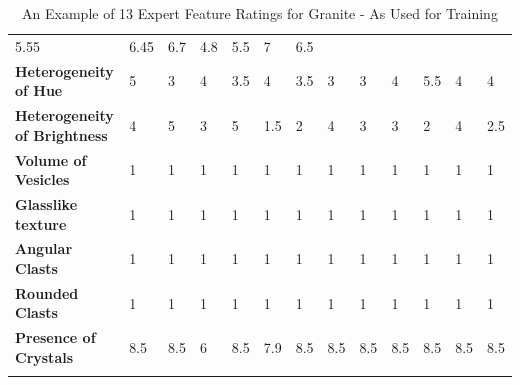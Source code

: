 \begin{longtable}[c]{@{}lllllllllllll@{}}
  5.55 &
  6.45 &
  6.7 &
  4.8 &
  5.5 &
  7 &
  6.5 \\
\cellcolor[HTML]{E2EFDA}\textbf{Heterogeneity   of Hue} &
  5 &
  3 &
  4 &
  3.5 &
  4 &
  3.5 &
  3 &
  3 &
  4 &
  5.5 &
  4 &
  4 \\
\cellcolor[HTML]{E2EFDA}\textbf{Heterogeneity   of Brightness} &
  4 &
  5 &
  3 &
  5 &
  1.5 &
  2 &
  4 &
  3 &
  3 &
  2 &
  4 &
  2.5 \\
\cellcolor[HTML]{E2EFDA}\textbf{Volume of   Vesicles} &
  1 &
  1 &
  1 &
  1 &
  1 &
  1 &
  1 &
  1 &
  1 &
  1 &
  1 &
  1 \\
\cellcolor[HTML]{E2EFDA}\textbf{Glasslike   texture} &
  1 &
  1 &
  1 &
  1 &
  1 &
  1 &
  1 &
  1 &
  1 &
  1 &
  1 &
  1 \\
\cellcolor[HTML]{E2EFDA}\textbf{Angular Clasts} &
  1 &
  1 &
  1 &
  1 &
  1 &
  1 &
  1 &
  1 &
  1 &
  1 &
  1 &
  1 \\
\cellcolor[HTML]{E2EFDA}\textbf{Rounded Clasts} &
  1 &
  1 &
  1 &
  1 &
  1 &
  1 &
  1 &
  1 &
  1 &
  1 &
  1 &
  1 \\
\cellcolor[HTML]{E2EFDA}\textbf{Presence of   Crystals} &
  8.5 &
  8.5 &
  6 &
  8.5 &
  7.9 &
  8.5 &
  8.5 &
  8.5 &
  8.5 &
  8.5 &
  8.5 &
  8.5
\\
\caption{An Example of 13 Expert Feature Ratings for Granite - As Used for Training}
\label{An Example of 13 Expert Feature Ratings for Granite - As Used for Training}\\
\end{longtable}


